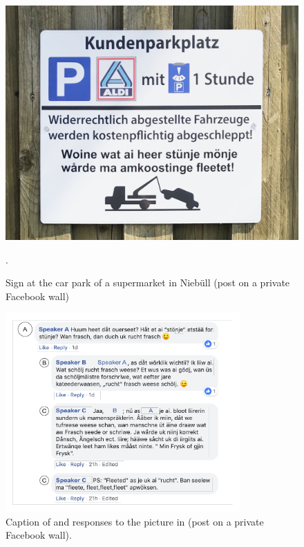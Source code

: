 \documentclass[output=paper]{langsci/langscibook}
\begin{document}
\begin{figure}
\includegraphics[width=\textwidth]{figures/fig1_gregersen.jpg}
\caption{Sign at the car park of a supermarket in Niebüll (post on a private Facebook wall)}\label{fig:gregersen:1}.
\end{figure}

  
 

\begin{figure}
\includegraphics[width=0.8\textwidth]{figures/fig2_gregersen.pdf}
\caption{Caption of and responses to the picture in  (post on a private Facebook wall).}\label{fig:gregersen:2}
\end{figure}
\end{document}
